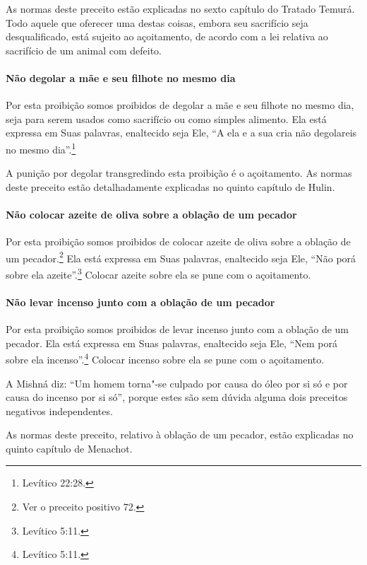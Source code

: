 \begin{multicols}{2}
As normas deste preceito estão explicadas no sexto capítulo do Tratado
Temurá\starr. Todo aquele que oferecer uma destas coisas, embora seu
sacrifício seja desqualificado, está sujeito ao açoitamento, de acordo
com a lei relativa ao sacrifício de um animal com defeito.

\paragraph{Não degolar a mãe e seu filhote no mesmo dia}

Por esta proibição somos proibidos de degolar a mãe e seu filhote no
mesmo dia, seja para serem usados como sacrifício ou como simples
alimento. Ela está expressa em Suas palavras, enaltecido seja Ele, ``A
ela e a sua cria não degolareis no mesmo dia''.\footnote{Levítico 22:28.}

A punição por degolar transgredindo esta proibição é o açoitamento. As
normas deste preceito estão detalhadamente explicadas no quinto
capítulo de Hulin\starr.

\paragraph{Não colocar azeite de oliva sobre a oblação de um pecador}

Por esta proibição somos proibidos de colocar azeite de oliva sobre a
oblação de um pecador.\footnote{Ver o preceito positivo 72.} Ela está expressa em Suas
palavras, enaltecido seja Ele, ``Não porá sobre ela azeite''.\footnote{Levítico
5:11.} Colocar azeite sobre ela se pune com o açoitamento.

\paragraph{Não levar incenso junto com a oblação de um pecador}

Por esta proibição somos proibidos de levar incenso junto com a oblação
de um pecador. Ela está expressa em Suas palavras, enaltecido seja Ele,
``Nem porá sobre ela incenso''.\footnote{Levítico 5:11.} Colocar incenso sobre
ela se pune com o açoitamento.

A Mishná\starr{} diz: ``Um homem torna"-se culpado por causa do óleo por si só e
por causa do incenso por si só'', porque estes são sem dúvida alguma
dois preceitos negativos independentes.

As normas deste preceito, relativo à oblação de um pecador, estão
explicadas no quinto capítulo de Menachot\starr.


\end{multicols}
